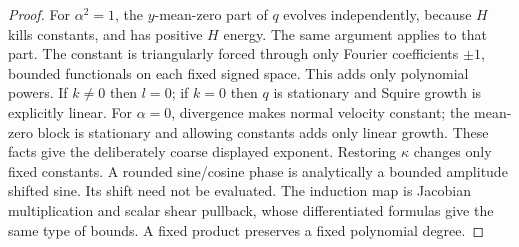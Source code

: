 \documentclass[11pt,a4paper]{amsart}
\theoremstyle{definition}
\theoremstyle{remark}
\numberwithin{equation}{section}
\begin{document}
\begin{proof}
For $\alpha^2=1$, the $y$-mean-zero part of $q$ evolves independently,
because $H$ kills constants, and has positive $H$ energy. The same argument
applies to that part. The constant is triangularly forced through only
Fourier coefficients $\pm1$, bounded functionals on each fixed signed
space. This adds only polynomial powers. If $k\ne0$ then $l=0$; if $k=0$
then $q$ is stationary and Squire growth is explicitly linear. For
$\alpha=0$, divergence makes normal velocity constant; the mean-zero block
is stationary and allowing constants adds only linear growth. These facts
give the deliberately coarse displayed exponent. Restoring $\kappa$ changes
only fixed constants. A rounded sine/cosine phase is analytically a bounded
amplitude shifted sine. Its shift need not be evaluated. The induction map
is Jacobian multiplication and scalar shear pullback, whose differentiated
formulas give the same type of bounds. A fixed product preserves a fixed
polynomial degree.
\end{proof}
\end{document}
